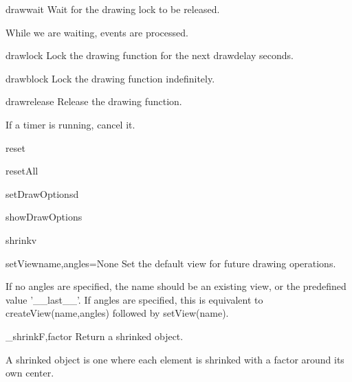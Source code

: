
\begin{funcdesc}{drawwait}{}
Wait for the drawing lock to be released.

While we are waiting, events are processed.

\end{funcdesc}

\begin{funcdesc}{drawlock}{}
Lock the drawing function for the next drawdelay seconds.
\end{funcdesc}

\begin{funcdesc}{drawblock}{}
Lock the drawing function indefinitely.
\end{funcdesc}

\begin{funcdesc}{drawrelease}{}
Release the drawing function.

If a timer is running, cancel it.

\end{funcdesc}

\begin{funcdesc}{reset}{}
\end{funcdesc}

\begin{funcdesc}{resetAll}{}
\end{funcdesc}

\begin{funcdesc}{setDrawOptions}{d}
\end{funcdesc}

\begin{funcdesc}{showDrawOptions}{}
\end{funcdesc}

\begin{funcdesc}{shrink}{v}
\end{funcdesc}

\begin{funcdesc}{setView}{name,angles=None}
Set the default view for future drawing operations.

If no angles are specified, the name should be an existing view, or
the predefined value '__last__'.
If angles are specified, this is equivalent to createView(name,angles)
followed by setView(name).

\end{funcdesc}

\begin{funcdesc}{_shrink}{F,factor}
Return a shrinked object.

A shrinked object is one where each element is shrinked with a factor
around its own center.

\end{funcdesc}

